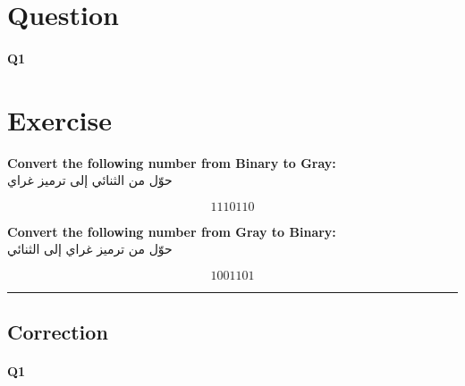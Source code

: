 
\section{Question}


\paragraph{Q1}







\section*{Exercise}

\textbf{Convert the following number from Binary to Gray:}\\
حوّل من الثنائي إلى ترميز غراي

\[
  1110110
\]

\bigskip

\textbf{Convert the following number from Gray to Binary:}\\
حوّل من ترميز غراي إلى الثنائي

\[
  1001101
\]




\hrule width 1\linewidth
\pagebreak

\subsection{Correction}


\paragraph{Q1}



